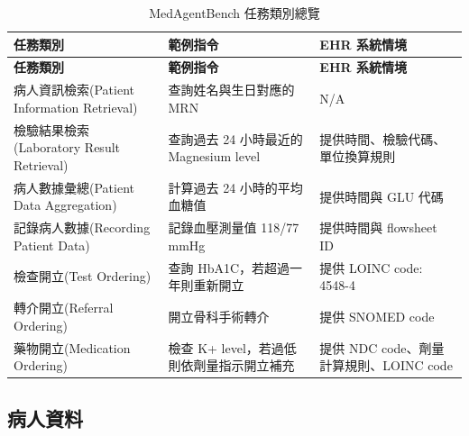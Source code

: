 \documentclass[12pt,a4paper]{article}
\begin{document}
\begin{longtable}{p{3.5cm}p{5cm}p{6cm}}
\caption{MedAgentBench 任務類別總覽} \\
\toprule
\textbf{任務類別} & \textbf{範例指令} & \textbf{EHR 系統情境} \\
\midrule
\endfirsthead

\toprule
\textbf{任務類別} & \textbf{範例指令} & \textbf{EHR 系統情境} \\
\midrule
\endhead

\bottomrule
\endfoot

病人資訊檢索\newline (Patient Information Retrieval) &
查詢姓名與生日對應的 MRN &
N/A \\
\midrule

檢驗結果檢索\newline (Laboratory Result Retrieval) &
查詢過去 24 小時最近的 Magnesium level &
提供時間、檢驗代碼、單位換算規則 \\
\midrule

病人數據彙總\newline (Patient Data Aggregation) &
計算過去 24 小時的平均血糖值 &
提供時間與 GLU 代碼 \\
\midrule

記錄病人數據\newline (Recording Patient Data) &
記錄血壓測量值 118/77 mmHg &
提供時間與 flowsheet ID \\
\midrule

檢查開立\newline (Test Ordering) &
查詢 HbA1C，若超過一年則重新開立 &
提供 LOINC code: 4548-4 \\
\midrule

轉介開立\newline (Referral Ordering) &
開立骨科手術轉介 &
提供 SNOMED code \\
\midrule

藥物開立\newline (Medication Ordering) &
檢查 K+ level，若過低則依劑量指示開立補充 &
提供 NDC code、劑量計算規則、LOINC code \\
\bottomrule
\end{longtable}

\subsection{病人資料}
\end{document}
